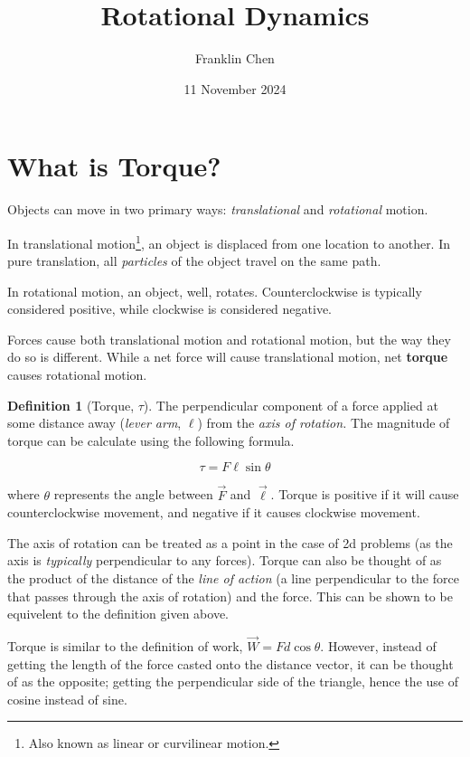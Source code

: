 \documentclass[12pt, a4paper]{article}
\title{Rotational Dynamics}
\author{Franklin Chen}
\date{11 November 2024}
\theoremstyle{definition}
\newtheorem{definition}{Definition}
\begin{document}
\maketitle
\newpage

\section{What is Torque?}

Objects can move in two primary ways: \emph{translational} and \emph{rotational} motion.

In translational motion\footnote{ Also known as linear or curvilinear motion.}, an object is displaced from one location to another.
In pure translation, all \emph{particles} of the object travel on the same path.

In rotational motion, an object, well, rotates. Counterclockwise is typically considered positive, while clockwise is considered negative.

Forces cause both translational motion and rotational motion, but the way they do so is different. While a net force will cause translational motion, net \textbf{torque} causes rotational motion.

\begin{definition}[Torque, \(\tau\)]
    The perpendicular component of a force applied at some distance away (\emph{lever arm}, \(\ell\)) from the \emph{axis of rotation.} The magnitude of torque can be calculate using the following formula.

    \[\tau = F\ell\sin{\theta}\]

    where \(\theta\) represents the angle between $\vec{F}$ and $\vec{\ell}$. Torque is positive if it will cause counterclockwise movement, and negative if it causes clockwise movement.
\end{definition}

The axis of rotation can be treated as a point in the case of 2d problems (as the axis is \emph{typically} perpendicular to any forces). Torque can also be thought of as the product of the distance of the \emph{line of action} (a line perpendicular to the force that passes through the axis of rotation) and the force. This can be shown to be equivelent to the definition given above.

Torque is similar to the definition of work, $\vec{W} = Fd\cos{\theta}$. However, instead of getting the length of the force casted onto the distance vector, it can be thought of as the opposite; getting the perpendicular side of the triangle, hence the use of cosine instead of sine.
\end{document}
